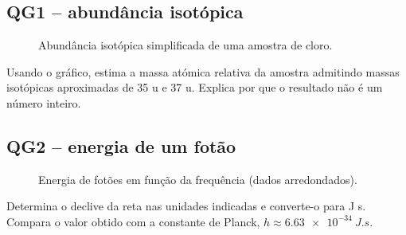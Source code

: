 \documentclass[11pt,a4paper,oneside]{book}
\begin{document}
\subsection*{QG1 -- abundância isotópica}
\begin{figure}[H]
\centering
{}
\caption{Abundância isotópica simplificada de uma amostra de cloro.}
\end{figure}
\begin{exercicios}[title=Exercício QG1]
Usando o gráfico, estima a massa atómica relativa da amostra admitindo massas isotópicas aproximadas de 35 u e 37 u. Explica por que o resultado não é um número inteiro.
\end{exercicios}

\subsection*{QG2 -- energia de um fotão}
\begin{figure}[H]
\centering
{}
\caption{Energia de fotões em função da frequência (dados arredondados).}
\end{figure}
\begin{exercicios}[title=Exercício QG2]
Determina o declive da reta nas unidades indicadas e converte-o para J s. Compara o valor obtido com a constante de Planck, $h\approx\SI{6.63e-34}{J.s}$.
\end{exercicios}
\end{document}
